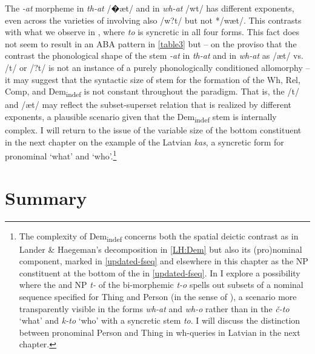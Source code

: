 \noindent The \textit{-at} morpheme in \textit{th-at} /�\ae t/ and in \textit{wh-at} /w\textturnscripta t/ has different exponents, even across the varieties of  involving also /w?t/ but not */w\ae t/. This contrasts with what we observe in , where \textit{to} is syncretic in all four forms. This fact does not seem to result in an ABA pattern  in \ref{table3} but -- on the proviso that the contrast the phonological shape of the stem \textit{-at} in \textit{th-at} and in \textit{wh-at} as /\ae t/ vs. /\textturnscripta t/ or /?t/ is not an instance of a purely phonologically conditioned  allomorphy -- it may suggest that the syntactic size of stem for the formation of the Wh, Rel, Comp, and Dem\textsubscript{indef} is not constant throughout the  paradigm. That is, the  /\textturnscripta t/ and /\ae t/ may reflect the subset-superset relation that is realized by different exponents, a plausible scenario given that the Dem\textsubscript{indef} stem is internally complex. I will return to the issue of the variable size of the bottom constituent in the next chapter on the example of the Latvian \textit{kas}, a syncretic form for pronominal `what' and `who'.\footnote{\label{FN:differentbottoms}The complexity of Dem\textsubscript{indef} concerns both the spatial deictic contrast as in Lander \& Haegeman's \citeyearpar{Lander-Haegeman2016} decomposition in \ref{LH:Dem} but also its (pro)nominal component, marked in \ref{updated-fseq} and elsewhere in this chapter as the NP constituent at the bottom of the  in \ref{updated-fseq}. In \cite{Wiland-PSiCL} I explore a possibility where the  and  NP \textit{t-} of the bi-morphemic \textit{t-o} spells out subsets of a nominal sequence specified for Thing and Person (in the sense of \citeauthor{Cysouw2004} \citeyear{Cysouw2004,Cysouw2005}), a scenario more transparently visible in the  forms \textit{wh-at} and \textit{wh-o} rather than in the  \textit{\v{c}-to} `what' and \textit{k-to} `who' with a syncretic stem \textit{to}. I will discuss the distinction between pronominal Person and Thing in wh-queries in Latvian in the next chapter.
} %



\section{Summary}

